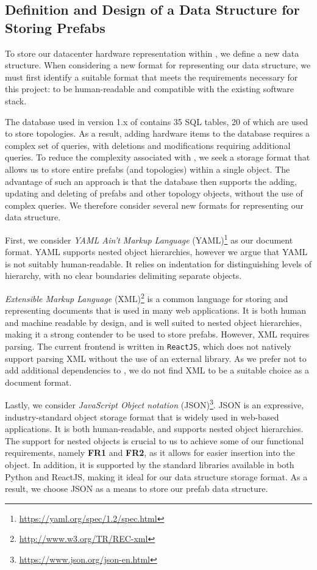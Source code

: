 \documentclass[11pt]{article}
\begin{document}
	\subsection{Definition and Design of a Data Structure for Storing Prefabs}
		To store our datacenter hardware representation within \opendc{}, we define a new data structure.
		When considering a new format for representing our data structure, we must first identify a suitable format that meets the requirements necessary for this project: to be human-readable and compatible with the existing \opendc{} software stack.

		The database used in version 1.x of \opendc{} contains 35 SQL tables, 20 of which are used to store topologies.
		As a result, adding hardware items to the database requires a complex set of queries, with deletions and modifications requiring additional queries.
		To reduce the complexity associated with \opendc{}, we seek a storage format that allows us to store entire prefabs (and topologies) within a single object.
		The advantage of such an approach is that the database then supports the adding, updating and deleting of prefabs and other topology objects, without the use of complex queries.
		We therefore consider several new formats for representing our data structure.

		First, we consider \textit{YAML Ain't Markup Language} (YAML)\footnote{\url{https://yaml.org/spec/1.2/spec.html}} as our document format.
		YAML supports nested object hierarchies, however we argue that YAML is not suitably human-readable.
		It relies on indentation for distinguishing levels of hierarchy, with no clear boundaries delimiting separate objects.

		\textit{Extensible Markup Language} (XML)\footnote{\url{http://www.w3.org/TR/REC-xml}} is a common language for storing and representing documents that is used in many web applications.
		It is both human and machine readable by design, and is well suited to nested object hierarchies, making it a strong contender to be used to store prefabs.
		However, XML requires parsing.
		The current \opendc{} frontend is written in \verb|ReactJS|, which does not natively support parsing XML without the use of an external library.
		As we prefer not to add additional dependencies to \opendc{}, we do not find XML to be a suitable choice as a document format.

		Lastly, we consider \textit{JavaScript Object notation} (JSON)\footnote{\url{https://www.json.org/json-en.html}}.
		JSON is an expressive, industry-standard object storage format that is widely used in web-based applications.
		It is both human-readable, and supports nested object hierarchies.
		The support for nested objects is crucial to us to achieve some of our functional requirements, namely \textbf{FR1} and \textbf{FR2}, as it allows for easier insertion into the object.
		In addition, it is supported by the standard libraries available in both Python and ReactJS, making it ideal for our data structure storage format.
		As a result, we choose JSON as a means to store our prefab data structure.
		
\end{document}
